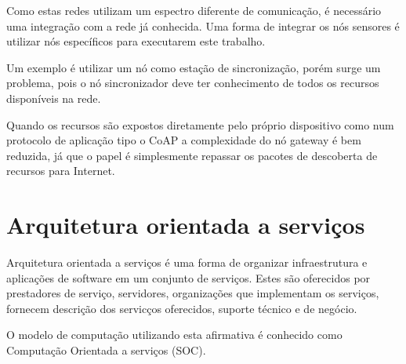Como estas redes utilizam um espectro diferente de comunica\c{c}\~ao, \'e necess\'ario uma integra\c{c}\~ao com a rede j\'a conhecida. Uma forma de integrar os n\'os sensores \'e utilizar n\'os espec\'ificos para executarem este trabalho. 

Um exemplo \'e utilizar um n\'o como esta\c{c}\~ao de sincroniza\c{c}\~ao, por\'em surge um problema, pois o n\'o sincronizador deve ter conhecimento de todos os recursos dispon\'iveis na rede.

Quando os recursos s\~ao expostos diretamente pelo pr\'oprio dispositivo como num protocolo de aplica\c{c}\~ao tipo o CoAP a complexidade do n\'o gateway \'e bem reduzida, j\'a que o papel \'e simplesmente repassar os pacotes de descoberta de recursos para Internet. \cite{Colitti11deintegrating}


%
%

\section{Arquitetura orientada a servi\c{c}os}

Arquitetura orientada a servi\c{c}os \'e uma forma de organizar infraestrutura e aplica\c{c}\~oes de software em um conjunto de servi\c{c}os. Estes s\~ao oferecidos por prestadores de servi\c{c}o, servidores, organiza\c{c}\~oes que implementam os servi\c{c}os, fornecem descri\c{c}\~ao dos servic\c{c}os oferecidos, suporte t\'ecnico e de neg\'ocio.

O modelo de computa\c{c}\~ao utilizando esta afirmativa \'e conhecido como Computa\c{c}\~ao Orientada a servi\c{c}os (SOC). \cite{581580}

